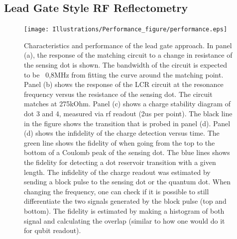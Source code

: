 \documentclass[twocolumn]{article}
\begin{document}

\subsection{Lead Gate Style RF Reflectometry} %
\label{sub:capacitive_style_rf_reflectometry}


\begin{figure}
	\texttt{[image: Illustrations/Performance\_figure/performance.eps]}
	\caption{Characteristics and performance of the lead gate approach. In panel (a), the response of the matching circuit to a change in resistance of the sensing dot is shown. The bandwidth of the circuit is expected to be ~0,8MHz from fitting the curve around the matching point.
		Panel (b) shows the response of the LCR circuit at the resonance frequency versus the resistance of the sensing dot. The circuit matches at 275kOhm.
		Panel (c) shows a charge stability diagram of dot 3 and 4, measured via rf readout (2us per point). The black line in the figure shows the transition that is probed in panel (d).
		Panel (d) shows the infidelity of the charge detection versus time. The green line shows the fidelity of when going from the top to the bottom of a Coulomb peak of the sensing dot. The blue lines shows the fidelity for detecting a dot reservoir transition with a given length. The infidelity of the charge readout was estimated by sending a block pulse to the sensing dot or the quantum dot. When changing the frequency, one can check if it is possible to still differentiate the two signals generated by the block pulse (top and bottom). The fidelity is estimated by making a histogram of both signal and calculating the overlap (similar to how one would do it for qubit readout).
	}
	\label{fig:lead_gate_result}
\end{figure}	
\end{document}
